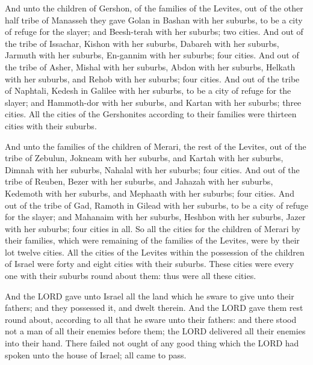  And unto the children of Gershon, of the families of the
Levites, out of the other half tribe of Manasseh they gave Golan in
Bashan with her suburbs, to be a city of refuge for the slayer; and
Beesh-terah with her suburbs; two cities.  And out of the
tribe of Issachar, Kishon with her suburbs, Dabareh with her suburbs,
 Jarmuth with her suburbs, En-gannim with her suburbs; four
cities.  And out of the tribe of Asher, Mishal with her
suburbs, Abdon with her suburbs,  Helkath with her suburbs,
and Rehob with her suburbs; four cities.  And out of the
tribe of Naphtali, Kedesh in Galilee with her suburbs, to be a city of
refuge for the slayer; and Hammoth-dor with her suburbs, and Kartan with
her suburbs; three cities.  All the cities of the
Gershonites according to their families were thirteen cities with their
suburbs.

 And unto the families of the children of Merari, the rest
of the Levites, out of the tribe of Zebulun, Jokneam with her suburbs,
and Kartah with her suburbs,  Dimnah with her suburbs,
Nahalal with her suburbs; four cities.  And out of the
tribe of Reuben, Bezer with her suburbs, and Jahazah with her suburbs,
 Kedemoth with her suburbs, and Mephaath with her suburbs;
four cities.  And out of the tribe of Gad, Ramoth in Gilead
with her suburbs, to be a city of refuge for the slayer; and Mahanaim
with her suburbs,  Heshbon with her suburbs, Jazer with her
suburbs; four cities in all.  So all the cities for the
children of Merari by their families, which were remaining of the
families of the Levites, were by their lot twelve cities. 
All the cities of the Levites within the possession of the children of
Israel were forty and eight cities with their suburbs. 
These cities were every one with their suburbs round about them: thus
were all these cities.

 And the LORD gave unto Israel all the land which he sware
to give unto their fathers; and they possessed it, and dwelt therein.
 And the LORD gave them rest round about, according to all
that he sware unto their fathers: and there stood not a man of all their
enemies before them; the LORD delivered all their enemies into their
hand.  There failed not ought of any good thing which the
LORD had spoken unto the house of Israel; all came to pass.

